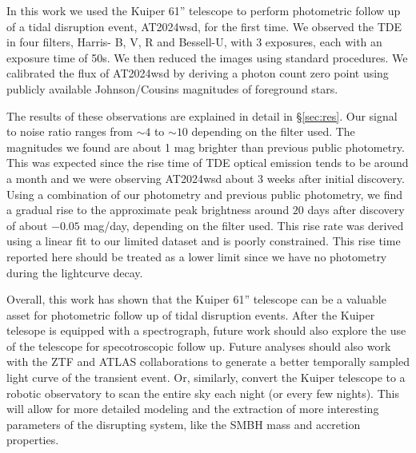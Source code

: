 \documentclass{aastex631}
\begin{document}
In this work we used the Kuiper 61'' telescope to perform photometric follow up of a tidal disruption event, AT2024wsd, for the first time. We observed the TDE in four filters, Harris- B, V, R and Bessell-U, with 3 exposures, each with an exposure time of 50s. We then reduced the images using standard procedures. We calibrated the flux of AT2024wsd by deriving a photon count zero point using publicly available Johnson/Cousins magnitudes of foreground stars.

The results of these observations are explained in detail in \S\ref{sec:res}. Our signal to noise ratio ranges from $\sim4$ to $\sim10$ depending on the filter used. The magnitudes we found are about 1 mag brighter than previous public photometry. This was expected since the rise time of TDE optical emission tends to be around a month and we were observing AT2024wsd about 3 weeks after initial discovery. Using a combination of our photometry and previous public photometry, we find a gradual rise to the approximate peak brightness around $20$ days after discovery of about $-0.05$ mag/day, depending on the filter used. This rise rate was derived using a linear fit to our limited dataset and is poorly constrained. This rise time reported here should be treated as a lower limit since we have no photometry during the lightcurve decay.

Overall, this work has shown that the Kuiper 61'' telescope can be a valuable asset for photometric follow up of tidal disruption events. After the Kuiper telesope is equipped with a spectrograph, future work should also explore the use of the telescope for specotroscopic follow up. Future analyses should also work with the ZTF and ATLAS collaborations to generate a better temporally sampled light curve of the transient event. Or, similarly, convert the Kuiper telescope to a robotic observatory to scan the entire sky each night (or every few nights). This will allow for more detailed modeling and the extraction of more interesting parameters of the disrupting system, like the SMBH mass and accretion properties. 



\end{document}
